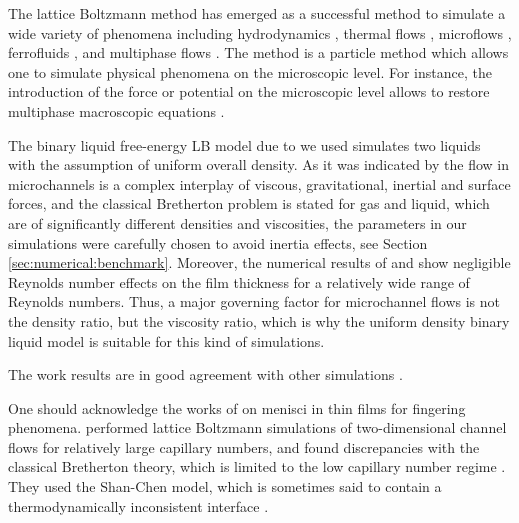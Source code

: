 \documentclass{article}
\begin{document}
The lattice Boltzmann method has emerged as a successful method to simulate
a wide variety of phenomena including hydrodynamics \cite{yu}, thermal flows
\cite{karlin-minimalmodels}, microflows \cite{ansumali-small-knudsen},
ferrofluids \cite{kuzmin-aniso}, and multiphase flows
\cite{swift,Shan-chen:extended}. The method is a particle method which allows one to simulate physical
phenomena on the microscopic level. For instance, the introduction of the force or potential on the
microscopic level allows to restore multiphase macroscopic equations \cite{swift,
Shan-chen:extended}.

The binary liquid free-energy LB model due to \citet{swift} we used
simulates two liquids with the assumption of uniform overall
density. As it was indicated by \citet{gupta-review} the flow in microchannels is a complex
interplay of viscous, gravitational, inertial and surface forces, and the classical Bretherton
problem is stated for gas and liquid, which are of
significantly
different densities and viscosities, the parameters in our simulations were carefully chosen to
avoid  inertia
effects, see Section \ref{sec:numerical:benchmark}. Moreover, the numerical results of
\citet{giavedoni-numerical} and \citet{heil-bretherton} show
negligible Reynolds number effects on the film thickness for a relatively wide range of Reynolds
numbers. Thus, a major governing factor for microchannel flows is not the density ratio, but
the
viscosity ratio, which is why the uniform density binary liquid model is suitable for this kind of
simulations.

The work results are in good agreement with other simulations \cite{heil-threedim,wang-non-circular}.

One should acknowledge the works of \citet{pagonabarraga-fingers} on menisci
in thin films for fingering phenomena. \citet{sehgal-microchannel} performed lattice Boltzmann
simulations of two-dimensional channel flows for relatively large capillary numbers, and
found discrepancies with the classical Bretherton theory, which
is limited to the low capillary number regime \cite{giavedoni-numerical}. They used the Shan-Chen model,
 which is sometimes said to contain a thermodynamically
inconsistent interface \cite{nourgaliev-breakup}. 
\end{document}
